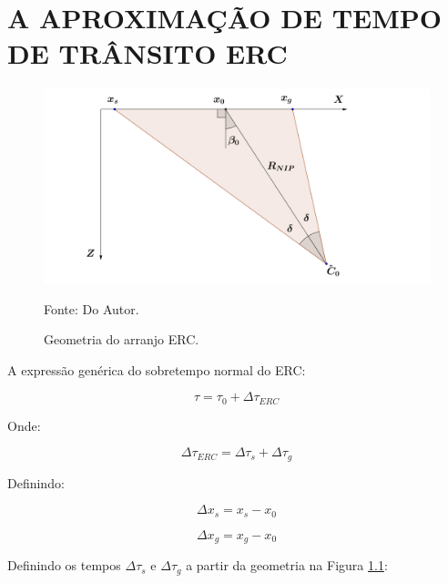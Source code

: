 \chapter{A APROXIMAÇÃO DE TEMPO DE TRÂNSITO ERC}
\label{ap:tempo_cre}

\begin{figure}[H]
\caption{Geometria do arranjo ERC.}
\begin{center}
\includegraphics[scale=0.5]{images/creGeom.png}
\vspace{-0.3cm}
\end{center}
\begin{center}
 Fonte: Do Autor.
\end{center}
\label{fig:ap:1.1}
\end{figure}

A expressão genérica do sobretempo normal do ERC:

\begin{equation}
\label{eq:ap:1.1}
\tau = \tau_0 + \Delta \tau_{ERC}
\end{equation}

Onde:

\begin{equation}
\label{eq:ap:1.2}
\Delta \tau_{ERC} = \Delta \tau_s + \Delta \tau_g
\end{equation}

Definindo:

\begin{equation}
\label{eq:ap:1.3}
\Delta x_s = x_s - x_0
\end{equation}

\begin{equation}
\label{eq:ap:1.4}
\Delta x_g = x_g - x_0
\end{equation}

Definindo os tempos $\Delta \tau_s$ e $\Delta \tau_g$ a partir da geometria na Figura \ref{fig:ap:1.1}:

